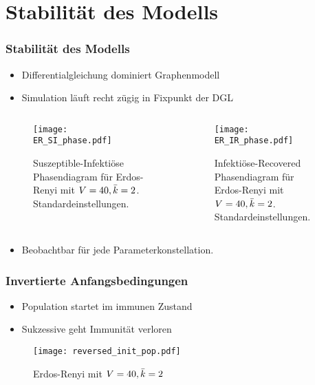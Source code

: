 \section{Stabilität des Modells}
\begin{frame}[t]
    \frametitle{Stabilität des Modells}
    \begin{itemize}
        \item Differentialgleichung dominiert Graphenmodell
        \item Simulation läuft recht zügig in Fixpunkt der DGL
    \end{itemize}
    \begin{columns}
        \begin{column}{0.5\textwidth}
    \begin{figure}[htpb]
        \centering
        \texttt{[image: ER\_SI\_phase.pdf]}
        \caption{Suszeptible-Infektiöse Phasendiagram für Erdos-Renyi mit $V = 40, \bar{k}=2$. Standardeinstellungen.}%
        \label{fig:ER_SI_phase}
    \end{figure}
\end{column}
\begin{column}{0.5\textwidth}
    \begin{figure}[htpb]
        \centering
        \texttt{[image: ER\_IR\_phase.pdf]}
        \caption{Infektiöse-Recovered Phasendiagram für Erdos-Renyi mit $V = 40, \bar{k}=2$.
        Standardeinstellungen.}%
        \label{fig:ER_IR_phase}
    \end{figure}
\end{column}
\end{columns}
\begin{itemize}
    \item<2-> Beobachtbar für jede Parameterkonstellation.
\end{itemize}
\end{frame}
\begin{frame}[t]
    \frametitle{Invertierte Anfangsbedingungen}
    \begin{itemize}
        \item Population startet im immunen Zustand
        \item Sukzessive geht Immunität verloren
    \end{itemize}
    \begin{figure}[htpb]
        \centering
        \texttt{[image: reversed\_init\_pop.pdf]}
        \caption{Erdos-Renyi mit $V = 40, \bar{k} =2$}%
        \label{fig:reversed_init_pop}
    \end{figure}
    
\end{frame}


